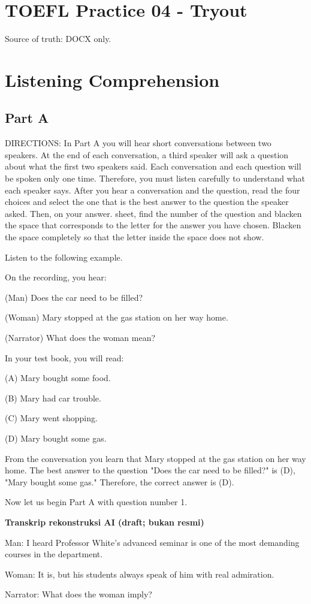 \documentclass[12pt]{article}
\begin{document}
\section*{TOEFL Practice 04 - Tryout}
Source of truth: DOCX only.
\section*{Listening Comprehension}
\subsection*{Part A}
DIRECTIONS: In Part A you will hear short conversations between two speakers. At the end of each conversation, a third speaker will ask a question about what the first two speakers said. Each conversation and each question will be spoken only one time. Therefore, you must listen carefully to understand what each speaker says. After you hear a conversation and the question, read the four choices and select the one that is the best answer to the question the speaker asked. Then, on your answer. sheet, find the number of the question and blacken the space that corresponds to the letter for the answer you have chosen. Blacken the space completely so that the letter inside the space does not show.\par
\begin{exampleblock}
Listen to the following example.\par
On the recording, you hear:\par
(Man) Does the car need to be filled?\par
(Woman) Mary stopped at the gas station on her way home.\par
(Narrator) What does the woman mean?\par
In your test book, you will read:\par
(A) Mary bought some food.\par
(B) Mary had car trouble.\par
(C) Mary went shopping.\par
(D) Mary bought some gas.\par
From the conversation you learn that Mary stopped at the gas station on her way home. The best answer to the question "Does the car need to be filled?" is (D), "Mary bought some gas." Therefore, the correct answer is (D).\par
Now let us begin Part A with question number 1.\par
\end{exampleblock}
\begin{exampleblock}
\textbf{Transkrip rekonstruksi AI (draft; bukan resmi)}\par
Man: I heard Professor White's advanced seminar is one of the most demanding courses in the department.\par
Woman: It is, but his students always speak of him with real admiration.\par
Narrator: What does the woman imply?\par
\end{exampleblock}
\end{document}
